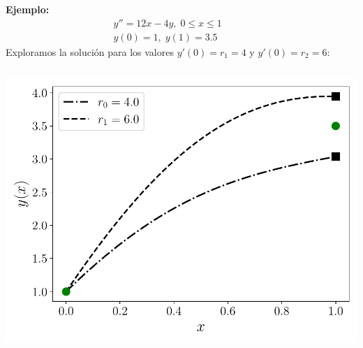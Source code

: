 \documentclass[9pt, aspectratio=169]{beamer}
\begin{document}
\begin{frame}
    \begin{columns}[t]
\textbf{Ejemplo:}
\[ \begin{split} y'' = 12 x - 4 y, \; 0 \leq x \leq 1 \\ y(0) = 1,\; y(1) = 3.5 \end{split} \]
Exploramos la solución para los valores $y'(0) = r_1 = 4$ y $y'(0) = r_2 = 6$:
\end{columns}
\begin{center}
   \includegraphics[height=0.5\textheight]{code/disparo-pre.pdf}
\end{center}
\end{frame}
\end{document}
